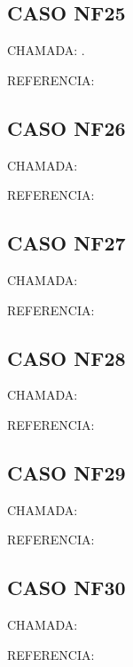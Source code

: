 \documentclass{undftex}
\begin{document}
\begin{refsection}\section*{CASO NF25}\noindent CHAMADA: . \par\noindent REFERENCIA:\par\printbibliography[heading=none]\end{refsection}\clearpage
\begin{refsection}\section*{CASO NF26}\noindent CHAMADA: \par\noindent REFERENCIA:\par\printbibliography[heading=none]\end{refsection}\clearpage
\begin{refsection}\section*{CASO NF27}\noindent CHAMADA: \par\noindent REFERENCIA:\par\printbibliography[heading=none]\end{refsection}\clearpage
\begin{refsection}\section*{CASO NF28}\noindent CHAMADA: \par\noindent REFERENCIA:\par\printbibliography[heading=none]\end{refsection}\clearpage
\begin{refsection}\section*{CASO NF29}\noindent CHAMADA: \par\noindent REFERENCIA:\par\printbibliography[heading=none]\end{refsection}\clearpage
\begin{refsection}\section*{CASO NF30}\noindent CHAMADA: \par\noindent REFERENCIA:\par\printbibliography[heading=none]\end{refsection}\clearpage
\end{document}
